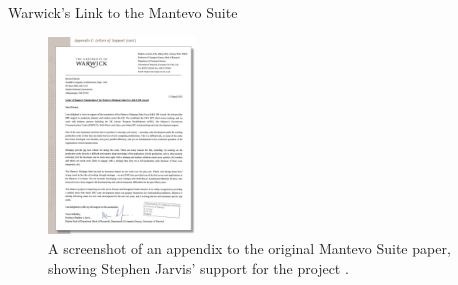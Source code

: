 \documentclass[10pt,aspectratio=169]{beamer}
\begin{document}
\begin{frame}{Warwick's Link to the Mantevo Suite}
    \begin{figure}[H]
        \includegraphics[width=0.35\textwidth]{images/warwick_mantevo_link.png}
        \caption{A screenshot of an appendix to the original Mantevo Suite paper, showing Stephen Jarvis' support for the project \cite{heroux2013mantevo}.}
        \label{fig:warwick_mantevo_link}
    \end{figure}
\end{frame}
\end{document}
